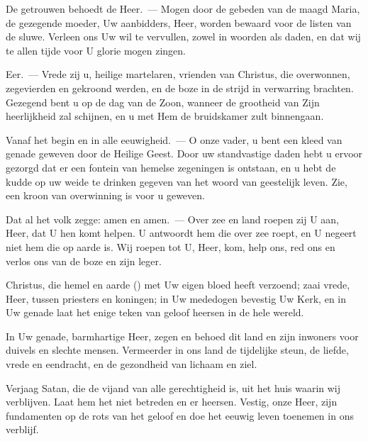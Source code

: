 \documentclass[12pt,twoside,a5paper]{article}
\begin{document}
\begin{halfparskip}
  De getrouwen behoedt de Heer.~--- Mogen door de gebeden van de maagd Maria, de gezegende moeder, Uw aanbidders, Heer, worden bewaard voor de listen van de sluwe. Verleen ons Uw wil te vervullen, zowel in woorden als daden, en dat wij te allen tijde voor U glorie mogen zingen.

  Eer.~--- Vrede zij u, heilige martelaren, vrienden van Christus, die overwonnen, zegevierden en gekroond werden, en de boze in de strijd in verwarring brachten. Gezegend bent u op de dag van de Zoon, wanneer de grootheid van Zijn heerlijkheid zal schijnen, en u met Hem de bruidskamer zult binnengaan.

  Vanaf het begin en in alle eeuwigheid.~--- O onze vader, u bent een kleed van genade geweven door de Heilige Geest. Door uw standvastige daden hebt u ervoor gezorgd dat er een fontein van hemelse zegeningen is ontstaan, en u hebt de kudde op uw weide te drinken gegeven van het woord van geestelijk leven. Zie, een kroon van overwinning is voor u geweven.

  Dat al het volk zegge: amen en amen.~--- Over zee en land roepen zij U aan, Heer, dat U hen komt helpen. U antwoordt hem die over zee roept, en U negeert niet hem die op aarde is. Wij roepen tot U, Heer, kom, help ons, red ons en verlos ons van de boze en zijn leger.

  Christus, die hemel en aarde () met Uw eigen bloed heeft verzoend; zaai vrede, Heer, tussen priesters en koningen; in Uw mededogen bevestig Uw Kerk, en in Uw genade laat het enige teken van geloof heersen in de hele wereld.

  In Uw genade, barmhartige Heer, zegen en behoed dit land en zijn inwoners voor duivels en slechte mensen. Vermeerder in ons land de tijdelijke steun, de liefde, vrede en eendracht, en de gezondheid van lichaam en ziel.

  Verjaag Satan, die de vijand van alle gerechtigheid is, uit het huis waarin wij verblijven. Laat hem het niet betreden en er heersen. Vestig, onze Heer, zijn fundamenten op de rots van het geloof en doe het eeuwig leven toenemen in ons verblijf.
\end{halfparskip}

\end{document}
